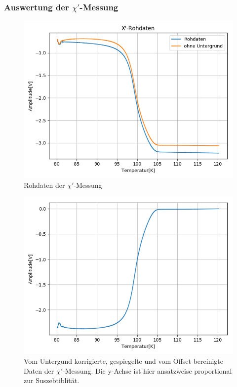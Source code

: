 \documentclass[12pt,a4paper]{article}
\begin{document}
\subsubsection{Auswertung der $\chi'$-Messung}
\begin{figure}
\centering
\includegraphics[scale=0.8]{Bilder/Haupt_Supra/X1roh.png}
\caption{Rohdaten der $\chi'$-Messung}
\label{fig:Supra_X1roh}
\end{figure}

\begin{figure}
\centering
\includegraphics[scale=0.8]{Bilder/Haupt_Supra/X1_spiegel.png}
\caption{Vom Untergund korrigierte, gespiegelte und vom Offset bereinigte Daten der $\chi'$-Messung. Die y-Achse ist hier ansatzweise proportional zur Suszebtiblität.}
\label{fig:Supra_X1spiegel}
\end{figure}
\end{document}
